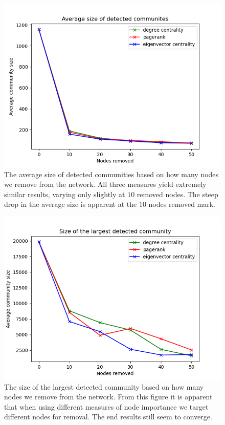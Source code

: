 \documentclass[9pt,twocolumn,twoside]{pnas-new}
\begin{document}
\begin{figure}[!htbp]
    \centering
    \includegraphics[width=0.9\linewidth]{avg_size.png}
    \caption{The average size of detected communities based on how many nodes we remove from the network.
    All three measures yield extremely similar results, varying only slightly at $10$ removed nodes. 
    The steep drop in the average size is apparent at the $10$ nodes removed mark.}
    \label{avg_size}
\end{figure}

\begin{figure}[!htbp]
    \centering
    \includegraphics[width=0.9\linewidth]{max_size.png}
    \caption{The size of the largest detected community based on how many nodes we remove from the network.
    From this figure it is apparent that when using different measures of node importance we target different nodes for removal.
    The end results still seem to converge.}
    \label{max_size}
\end{figure}
\end{document}
